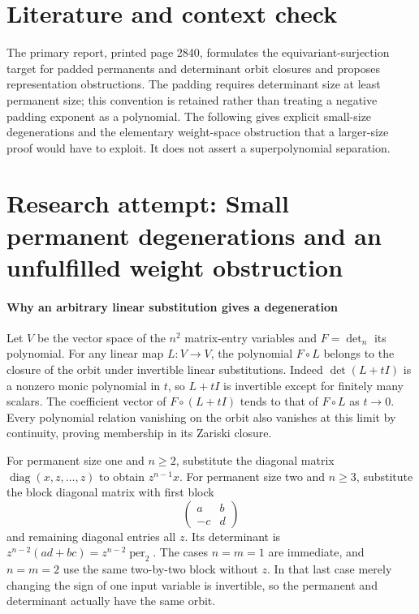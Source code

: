 \documentclass[11pt]{article}
\begin{document}
\section{Literature and context check}
The primary report, printed page 2840, formulates the equivariant-surjection target for padded permanents and determinant orbit closures and proposes representation obstructions. The padding requires determinant size at least permanent size; this convention is retained rather than treating a negative padding exponent as a polynomial. The following gives explicit small-size degenerations and the elementary weight-space obstruction that a larger-size proof would have to exploit. It does not assert a superpolynomial separation.
\section{Research attempt: Small permanent degenerations and an unfulfilled weight obstruction}

\paragraph{Why an arbitrary linear substitution gives a degeneration}
Let $V$ be the vector space of the $n^2$ matrix-entry variables and $F=\det_n$ its polynomial. For any linear map $L:V\to V$, the polynomial $F\circ L$ belongs to the closure of the orbit under invertible linear substitutions. Indeed $\det(L+tI)$ is a nonzero monic polynomial in $t$, so $L+tI$ is invertible except for finitely many scalars. The coefficient vector of $F\circ(L+tI)$ tends to that of $F\circ L$ as $t\to0$. Every polynomial relation vanishing on the orbit also vanishes at this limit by continuity, proving membership in its Zariski closure.

For permanent size one and $n\geq2$, substitute the diagonal matrix $\operatorname{diag}(x,z,\ldots,z)$ to obtain $z^{n-1}x$. For permanent size two and $n\geq3$, substitute the block diagonal matrix with first block
\[
 \begin{pmatrix}a&b\\-c&d\end{pmatrix}
\]
and remaining diagonal entries all $z$. Its determinant is $z^{n-2}(ad+bc)=z^{n-2}\operatorname{per}_2$. The cases $n=m=1$ are immediate, and $n=m=2$ use the same two-by-two block without $z$. In that last case merely changing the sign of one input variable is invertible, so the permanent and determinant actually have the same orbit.
\end{document}
